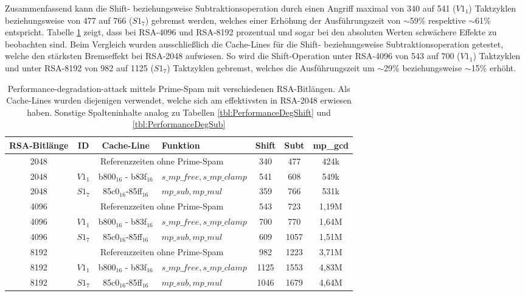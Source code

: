 Zusammenfassend kann die Shift- beziehungsweise Subtraktionsoperation durch einen Angriff maximal von 340 auf 541 ($V1_1$) Taktzyklen beziehungsweise von 477 auf 766 ($S1_7$) gebremst werden, welches einer Erhöhung der Ausführungszeit von $\sim$59\% respektive $\sim$61\% entspricht.
Tabelle \ref{tbl:PerformanceDegR$S2_6$ifferentBitlength} zeigt, dass bei RSA-4096 und RSA-8192 prozentual und sogar bei den absoluten Werten schwächere Effekte zu beobachten sind.
Beim Vergleich wurden ausschließlich die Cache-Lines für die Shift- beziehungsweise Subtraktionsoperation getestet, welche den stärksten Bremseffekt bei RSA-2048 aufwiesen.
So wird die Shift-Operation unter RSA-4096 von 543 auf 700 ($V1_1$) Taktzyklen und unter RSA-8192 von 982 auf 1125 ($S1_7$) Taktzyklen gebremst, welches die Ausführungszeit um $\sim$29\% beziehungsweise $\sim$15\% erhöht.

\begin{table}[h]
\caption{Performance-degradation-attack mittels Prime-Spam mit verschiedenen RSA-Bitlängen.
Als Cache-Lines wurden diejenigen verwendet, welche sich am effektivsten in RSA-2048 erwiesen haben.
Sonstige Spalteninhalte analog zu Tabellen \ref{tbl:PerformanceDegShift} und \ref{tbl:PerformanceDegSub}}
\label{tbl:PerformanceDegR$S2_6$ifferentBitlength}
\begin{tabular}{ccclccc}
\toprule
RSA-Bitlänge & ID & Cache-Line & Funktion & Shift & Subt & mp\_gcd \\
\midrule
2048         &\multicolumn{3}{c}{Referenzzeiten ohne Prime-Spam}                                         & 340   & 477         & 424k    \\
2048         & $V1_1$& b800$_{16}$ - b83f$_{16}$ & $s\_mp\_free, s\_mp\_clamp$                 & 541   & 608         & 549k    \\
2048         & $S1_7$& 85c0$_{16}$-85ff$_{16}$  & $mp\_sub, mp\_mul$            & 359   & 766         & 531k    \\
\midrule
4096         & \multicolumn{3}{c}{Referenzzeiten ohne Prime-Spam}                                         & 543   & 723         & 1,19M    \\
4096         & $V1_1$& b800$_{16}$ - b83f$_{16}$ & $s\_mp\_free, s\_mp\_clamp$                 & 700   & 770         & 1,64M    \\
4096         & $S1_7$& 85c0$_{16}$-85ff$_{16}$  & $mp\_sub, mp\_mul$            & 609   & 1057         & 1,51M    \\
\midrule
8192         & \multicolumn{3}{c}{Referenzzeiten ohne Prime-Spam}                                         & 982   & 1223         & 3,71M    \\
8192         & $V1_1$& b800$_{16}$ - b83f$_{16}$ & $s\_mp\_free, s\_mp\_clamp$                 & 1125   & 1553         & 4,83M    \\
8192         & $S1_7$& 85c0$_{16}$-85ff$_{16}$  & $mp\_sub, mp\_mul$            & 1046   & 1679         & 4,64M    \\
\bottomrule
\end{tabular}
\end{table}

